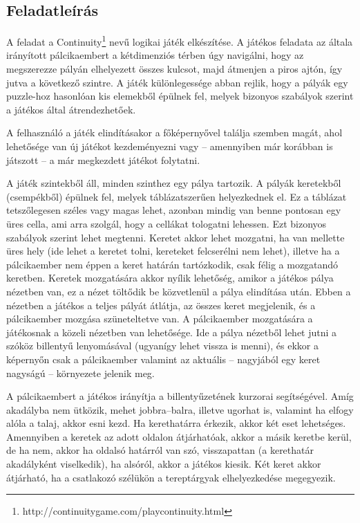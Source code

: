 \subsection{Feladatleírás}

	A feladat a Continuity\footnote{http://continuitygame.com/playcontinuity.html} nevű logikai játék elkészítése.  A játékos feladata az általa irányított pálcikaembert a kétdimenziós térben úgy navigálni, hogy az megszerezze pályán elhelyezett összes kulcsot, majd átmenjen a piros ajtón, így jutva a következő szintre. A játék különlegessége abban rejlik, hogy a pályák egy puzzle-hoz hasonlóan kis elemekből épülnek fel, melyek bizonyos szabályok szerint a játékos által átrendezhetőek.
	
	A felhasználó a játék elindításakor a főképernyővel találja szemben magát, ahol lehetősége van új játékot kezdeményezni vagy – amennyiben már korábban is játszott -- a már megkezdett játékot folytatni.
	
	A játék szintekből áll, minden szinthez egy pálya tartozik. A pályák keretekből (csempékből) épülnek fel, melyek táblázatszerűen helyezkednek el. Ez a táblázat tetszőlegesen széles vagy magas lehet, azonban mindig van benne pontosan egy üres cella, ami arra szolgál, hogy a cellákat tologatni lehessen. Ezt bizonyos szabályok szerint lehet megtenni. Keretet akkor lehet mozgatni, ha van mellette üres hely (ide lehet a keretet tolni, kereteket felcserélni nem lehet), illetve ha a pálcikaember nem éppen a keret határán tartózkodik, csak félig a mozgatandó keretben.
Keretek mozgatására akkor nyílik lehetőség, amikor a játékos pálya nézetben van, ez a nézet töltődik be közvetlenül a pálya elindítása után. Ebben a nézetben a játékos a teljes pályát átlátja, az összes keret megjelenik, és a pálcikaember mozgása szüneteltetve van.
A pálcikaember mozgatására a játékosnak a közeli nézetben van lehetősége. Ide a pálya nézetből lehet jutni a szóköz billentyű lenyomásával (ugyanígy lehet vissza is menni), és ekkor a képernyőn csak a pálcikaember valamint az aktuális -- nagyjából egy keret nagyságú -- környezete jelenik meg.
	
	A pálcikaembert a játékos irányítja a billentyűzetének kurzorai segítségével. Amíg akadályba nem ütközik, mehet jobbra--balra, illetve ugorhat is, valamint ha elfogy alóla a talaj, akkor esni kezd. Ha kerethatárra érkezik, akkor két eset lehetséges. Amennyiben a keretek az adott oldalon átjárhatóak, akkor a másik keretbe kerül, de ha nem, akkor ha oldalsó határról van szó, visszapattan (a kerethatár akadályként viselkedik), ha alsóról, akkor a játékos kiesik. Két keret akkor átjárható, ha a csatlakozó szélükön a tereptárgyak elhelyezkedése megegyezik.
	

